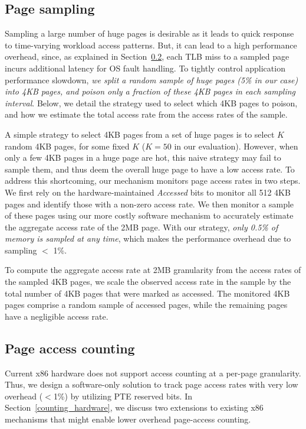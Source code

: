 \subsection{Page sampling}
\label{page-sampling}
Sampling a large number of huge pages is desirable as it leads to quick
response to time-varying workload access patterns. But, it can lead to a
high performance overhead, since, as explained in
Section~\ref{section:access-counting}, each TLB miss to a sampled page incurs additional
latency for OS fault handling. To tightly control application performance
slowdown, {\it we split a random sample of huge pages (5\% in our case)
into 4KB pages, and poison only a fraction of these 4KB pages in each sampling interval}.
Below, we detail the strategy used to select which 4KB pages to poison, and how
we estimate the total access rate from the access rates of the sample.

A simple strategy to select 4KB pages from a set of huge pages is to select $K$
random 4KB pages, for some fixed $K$ ($K = 50$ in our evaluation). However, when only a few 4KB
pages in a huge page are hot, this naive strategy may fail to sample them, and
thus deem the overall huge page to have a low access rate. To address this shortcoming, 
our mechanism monitors page access rates in two steps.
We first rely on the hardware-maintained {\it Accessed} bits to monitor all 512 4KB pages
and identify those with a  non-zero access rate.  We then monitor a sample of these 
pages using our more costly
software mechanism to accurately estimate the aggregate access rate of 
the 2MB page. With our strategy, {\it only 0.5\% of memory is sampled at any time}, which makes the performance overhead due to sampling
$<$ 1\%.

To compute the aggregate access rate at 2MB granularity from the access rates of the sampled
4KB pages, we scale the observed access rate in the sample by the total number
of 4KB pages that were marked as accessed. The monitored 4KB pages comprise a 
random sample of accessed pages, while the remaining pages have a negligible
access rate.

\subsection{Page access counting}
\label{section:access-counting}
Current x86 hardware does not support access counting at a per-page granularity.
Thus, we design a software-only solution to track page access rates with very
low overhead ($<$1\%) by utilizing PTE reserved bits. In
Section~\ref{counting_hardware}, we discuss two extensions to existing x86
mechanisms that might enable lower overhead page-access counting.

